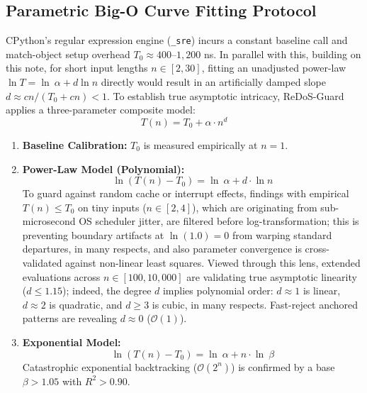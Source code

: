 \documentclass{ieeeaccess}
\begin{document}
\subsection{Parametric Big-O Curve Fitting Protocol}
CPython's regular expression engine (\texttt{\_sre}) incurs a constant baseline call and match-object setup overhead $T_0 \approx 400$--$1{,}200$ ns. In parallel with this, building on this note, for short input lengths $n \in [2, 30]$, fitting an unadjusted power-law $\ln T = \ln\ \alpha + d \ln n$ directly would result in an artificially damped slope $d \approx c n / (T_0 + c n) < 1$. To establish true asymptotic intricacy, ReDoS-Guard applies a three-parameter composite model:
\begin{equation}\label{eq:three_param_model}
T(n) = T_0 + \alpha \cdot n^d
\end{equation}
\begin{enumerate}
    \item \textbf{Baseline Calibration:} $T_0$ is measured empirically at $n = 1$.
    \item \textbf{Power-Law Model (Polynomial):}
    \begin{equation}\label{eq:power_law_ols}
    \ln(T(n) - T_0) = \ln\ \alpha + d \cdot \ln n
    \end{equation}
    To guard against random cache or interrupt effects, findings with empirical $T(n) \le T_0$ on tiny inputs ($n \in [2, 4]$), which are originating from sub-microsecond OS scheduler jitter, are filtered before log-transformation; this is preventing boundary artifacts at $\ln(1.0) = 0$ from warping standard departures, in many respects, and also parameter convergence is cross-validated against non-linear least squares. Viewed through this lens, extended evaluations across $n \in [100, 10{,}000]$ are validating true asymptotic linearity ($d \le 1.15$); indeed, the degree $d$ implies polynomial order: $d \approx 1$ is linear, $d \approx 2$ is quadratic, and $d \ge 3$ is cubic, in many respects. Fast-reject anchored patterns are revealing $d \approx 0$ ($\mathcal{O}(1)$).
    \item \textbf{Exponential Model:}
    \begin{equation}\label{eq:exp_semi_log}
    \ln(T(n) - T_0) = \ln\ \alpha + n \cdot \ln\ \beta
    \end{equation}
    Catastrophic exponential backtracking ($\mathcal{O}(2^n)$) is confirmed by a base $\beta > 1.05$ with $R^2 > 0.90$.
\end{enumerate}
\end{document}
